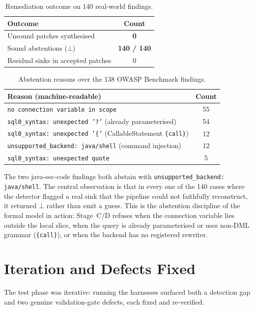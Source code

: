 \documentclass[11pt,a4paper]{article}
\newcommand{\bottom}{\ensuremath{\bot}}
\newcommand{\code}[1]{\texttt{\small #1}}
\begin{document}
\begin{table}[h]
\centering
\caption{Remediation outcome on 140 real-world findings.}
\label{tab:remediation}
\begin{tabular}{@{}lc@{}}
\toprule
\textbf{Outcome} & \textbf{Count} \\
\midrule
Unsound patches synthesised      & \textbf{0} \\
Sound abstentions (\bottom)      & \textbf{140 / 140} \\
Residual sinks in accepted patches & 0 \\
\bottomrule
\end{tabular}
\end{table}

\begin{table}[h]
\centering
\caption{Abstention reasons over the 138 OWASP Benchmark findings.}
\label{tab:abstain}
\begin{tabular}{@{}lc@{}}
\toprule
\textbf{Reason (machine-readable)} & \textbf{Count} \\
\midrule
\code{no connection variable in scope}                   & 55 \\
\code{sql0\_syntax: unexpected '?'} (already parameterised) & 54 \\
\code{sql0\_syntax: unexpected '\{'} (CallableStatement \code{\{call\}}) & 12 \\
\code{unsupported\_backend: java/shell} (command injection) & 12 \\
\code{sql0\_syntax: unexpected quote}                    & 5 \\
\bottomrule
\end{tabular}
\end{table}

The two java-sec-code findings both abstain with
\code{unsupported\_backend: java/shell}. The central observation is that
in every one of the 140 cases where the detector flagged a real sink that
the pipeline could not faithfully reconstruct, it returned \bottom{}
rather than emit a guess. This is the abstention discipline of the formal
model in action: Stage~C/D refuses when the connection variable lies
outside the local slice, when the query is already parameterised or uses
non-DML grammar (\code{\{call\}}), or when the backend has no registered
rewriter.

\section{Iteration and Defects Fixed}
\label{sec:iteration}
The test phase was iterative: running the harnesses surfaced both a
detection gap and two genuine validation-gate defects, each fixed and
re-verified.
\end{document}
